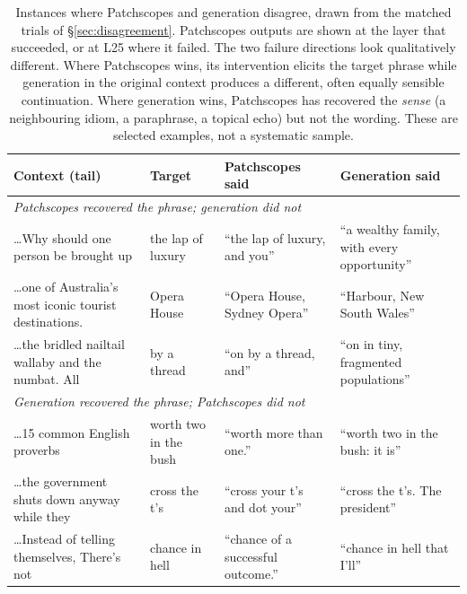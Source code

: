 \begin{table}[t]
\centering\small
\begin{tabular}{p{}p{}p{}p{}}
\toprule
\textbf{Context (tail)} & \textbf{Target} & \textbf{Patchscopes said} & \textbf{Generation said} \\
\midrule
\multicolumn{4}{l}{\textit{Patchscopes recovered the phrase; generation did not}} \\[2pt]
\ldots{}Why should one person be brought up & the lap of luxury &
\textcolor{hit}{``the lap of luxury, and you''} &
``a wealthy family, with every opportunity'' \\[3pt]
\ldots{}one of Australia's most iconic tourist destinations. & Opera House &
\textcolor{hit}{``Opera House, Sydney Opera''} &
``Harbour, New South Wales'' \\[3pt]
\ldots{}the bridled nailtail wallaby and the numbat. All & by a thread &
\textcolor{hit}{``on by a thread, and''} &
``on in tiny, fragmented populations'' \\
\midrule
\multicolumn{4}{l}{\textit{Generation recovered the phrase; Patchscopes did not}} \\[2pt]
\ldots{}15 common English proverbs & worth two in the bush &
``worth more than one.'' &
\textcolor{hit}{``worth two in the bush: it is''} \\[3pt]
\ldots{}the government shuts down anyway while they & cross the t's &
``cross your t's and dot your'' &
\textcolor{hit}{``cross the t's. The president''} \\[3pt]
\ldots{}Instead of telling themselves, There's not & chance in hell &
``chance of a successful outcome.'' &
\textcolor{hit}{``chance in hell that I'll''} \\
\bottomrule
\end{tabular}
\caption{Instances where Patchscopes and generation disagree, drawn from the
matched trials of \S\ref{sec:disagreement}. Patchscopes outputs are
shown at the layer that succeeded, or at L25 where it failed. The two failure
directions look qualitatively different. Where Patchscopes wins, its
intervention elicits the target phrase while generation in the original context
produces a different, often equally sensible continuation. Where generation
wins, Patchscopes has recovered the \emph{sense} (a neighbouring idiom, a
paraphrase, a topical echo) but not the wording. These are selected examples,
not a systematic sample.}
\label{tab:disagree}
\end{table}
